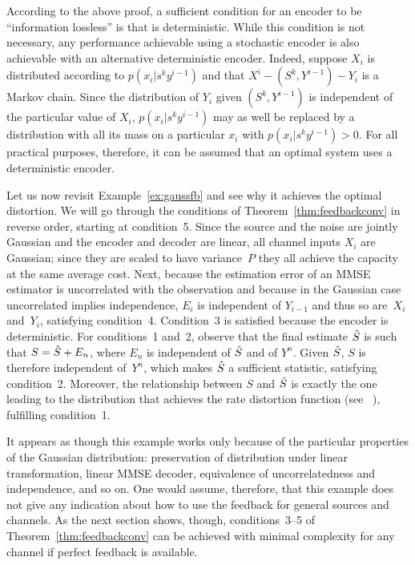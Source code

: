 \begin{remark}
  \label{rem:inflosslessenc}
  According to the above proof, a sufficient condition for an encoder to be
  ``information lossless'' is that is deterministic. While this condition is not
  necessary, any performance achievable using a stochastic encoder is
  also achievable with an alternative deterministic encoder. Indeed, suppose
  $X_i$ is distributed according to $p(x_i | s^k y^{i-1})$ and that $X^i - (S^k,
  Y^{i-1}) - Y_i$ is a Markov chain. Since the distribution of $Y_i$ given
  $(S^k, Y^{i-1})$ is independent of the particular value of $X_i$, $p(x_i | s^k
  y^{i-1})$ may as well be replaced by a distribution with all its mass on a
  particular $x_i$ with $p(x_i|s^k y^{i-1}) > 0$. For all practical purposes,
  therefore, it can be assumed that an optimal system uses a deterministic
  encoder.
%
\end{remark}

Let us now revisit Example~\ref{ex:gaussfb} and see why it achieves the optimal
distortion. We will go through the conditions of Theorem~\ref{thm:feedbackconv}
in reverse order, starting at condition~5. Since the source and the noise are
jointly Gaussian and the encoder and decoder are linear, all channel inputs
$X_i$ are Gaussian; since they are scaled to have variance~$P$ they all achieve
the capacity at the same average cost. Next, because the estimation error of an
MMSE estimator is uncorrelated with the observation and because in the Gaussian
case uncorrelated implies independence, $E_i$ is independent of $Y_{i-1}$ and
thus so are~$X_i$ and~$Y_i$, satisfying condition~4. Condition~3 is satisfied
because the encoder is deterministic. For conditions~1 and~2, observe that the
final estimate ${\hat{S}}$ is such that $S = {\hat{S}} + E_n$, where $E_n$ is independent of
${\hat{S}}$ and of $Y^n$. Given ${\hat{S}}$, $S$ is therefore independent of~$Y^n$, which
makes ${\hat{S}}$ a sufficient statistic, satisfying condition~2. Moreover, the
relationship between $S$ and ${\hat{S}}$ is exactly the one leading to the
distribution that achieves the rate distortion function (see
\eg~\cite{CoverT1991}), fulfilling condition~1.

It appears as though this example works only because of the particular
properties of the Gaussian distribution: preservation of distribution under
linear transformation, linear MMSE decoder, equivalence of uncorrelatedness and
independence, and so on. One would assume, therefore, that this example does not
give any indication about how to use the feedback for general sources and
channels. As the next section shows, though, conditions~3--5 of
Theorem~\ref{thm:feedbackconv} can be achieved with minimal complexity for any
channel if perfect feedback is available.


